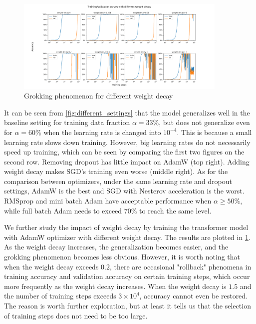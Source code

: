 \begin{figure}[!ht]
    \centering
    \includegraphics[width=0.9\textwidth]{fig/weight_decay/weight_decay.png}
    \caption{Grokking phenomenon for different weight decay}
    \label{fig:different weight_decay}
\end{figure}

It can be seen from \cref{fig:different_settings} that the model generalizes well in the baseline setting for training data fraction $\alpha = 33\%$, but does not generalize even for $\alpha = 60\%$ when the learning rate is changed into $10^{-4}$.
This is because a small learning rate slows down training.
However, big learning rates do not necessarily speed up training, which can be seen by comparing the first two figures on the second row. 
Removing dropout has little impact on AdamW (top right).
Adding weight decay makes SGD's training even worse (middle right).
As for the comparison between optimizers, under the same learning rate and dropout settings, AdamW is the best and SGD with Nesterov acceleration is the worst.
RMSprop and mini batch Adam have acceptable performance when $\alpha \geq 50\%$, while full batch Adam needs to exceed $70\%$ to reach the same level.

We further study the impact of weight decay by training the transformer model with AdamW optimizer with different weight decay.
The results are plotted in \cref{fig:different weight_decay}.
As the weight decay increases, the generalization becomes easier, and the grokking phenomenon becomes less obvious. 
However, it is worth noting that when the weight decay exceeds $0.2$, there are occasional "rollback" phenomena in training accuracy and validation accuracy on certain training steps, which occur more frequently as the weight decay increases. 
When the weight decay is $1.5$ and the number of training steps exceeds $3 \times 10^4$, accuracy cannot even be restored. 
The reason is worth further exploration, but at least it tells us that the selection of training steps does not need to be too large.